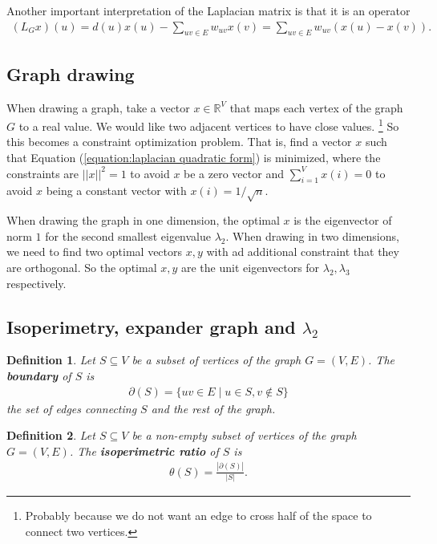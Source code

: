 \documentclass[]{article}
\newtheorem{definition}{Definition}[section] %
\begin{document}
	Another important interpretation of the Laplacian matrix is that it is an operator 
	\begin{align*}
	(L_Gx)(u) = d(u)x(u) - \sum_{uv \in E}w_{uv}x(v) = \sum_{uv \in E} w_{uv}(x(u)-x(v)).
	\end{align*}
	
	\subsection{Graph drawing}
	When drawing a graph, take a vector $x \in \mathbb{R}^V$ that maps each vertex of the graph $G$ to a real value. We would like two adjacent vertices to have close values. \footnote{Probably because we do not want an edge to cross half of the space to connect two vertices.} So this becomes a constraint optimization problem. That is, find a vector $x$ such that Equation (\ref{equation:laplacian quadratic form}) is minimized, where the constraints are $||x||^2=1$ to avoid $x$ be a zero vector and $\sum_{i=1}^V x(i) = 0$ to avoid $x$ being a constant vector with $x(i)=1/\sqrt{n}$.
	
	When drawing the graph in one dimension, the optimal $x$ is the eigenvector of norm $1$ for the second smallest eigenvalue $\lambda_2$. When drawing in two dimensions, we need to find two optimal vectors $x,y$ with ad additional constraint that they are orthogonal. So the optimal $x,y$ are the unit eigenvectors for $\lambda_2,\lambda_3$ respectively. 
	
	\subsection{Isoperimetry, expander graph and $\lambda_2$}
	\begin{definition}
		Let $S \subseteq V$ be a subset of vertices of the graph $G=(V,E)$. The \textbf{boundary} of $S$ is 
		\begin{align*}
		\partial(S) = \{uv \in E \mid u \in S, v \notin S\}
		\end{align*}
		the set of edges connecting $S$ and the rest of the graph. 
	\end{definition}
	
	\begin{definition}
		Let $S \subseteq V$ be a non-empty subset of vertices of the graph $G=(V,E)$. The \textbf{isoperimetric ratio} of $S$ is 
		\begin{align*}
		\theta(S) = \frac{|\partial(S)|}{|S|}.
		\end{align*}
	\end{definition}
	
\end{document}
